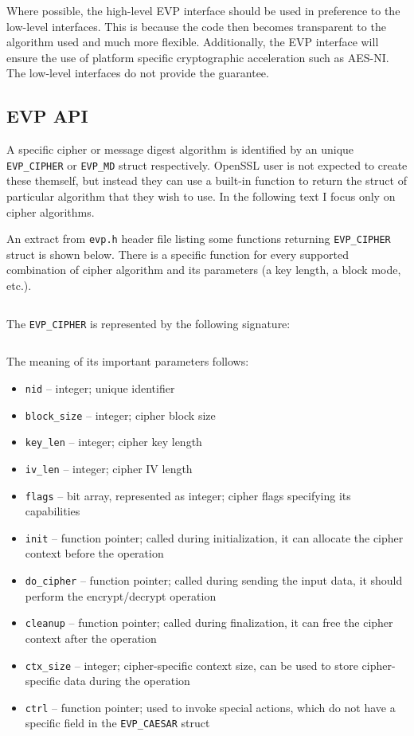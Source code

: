 Where possible, the high-level EVP interface should be used in preference to the low-level interfaces. This is because the code then becomes transparent to the algorithm used and much more flexible. Additionally, the EVP interface will ensure the use of platform specific cryptographic acceleration such as AES-NI. The low-level interfaces do not provide the guarantee.


\subsection{EVP API}
\label{toc/openssl-evp}

A specific cipher or message digest algorithm is identified by an unique \texttt{EVP\_CIPHER} or \texttt{EVP\_MD} struct respectively. OpenSSL user is not expected to create these themself, but instead they can use a built-in function to return the struct of particular algorithm that they wish to use. In the following text I focus only on cipher algorithms.

An extract from \texttt{evp.h} header file listing some functions returning \texttt{EVP\_CIPHER} struct is shown below. There is a specific function for every supported combination of cipher algorithm and its parameters (a key length, a block mode, etc.).

\inputminted{c}{code/openssl-evp-ciphers.c}

The \texttt{EVP\_CIPHER} is represented by the following signature:

\inputminted{c}{code/openssl-evp-cipher.c}

The meaning of its important parameters follows:

\begin{itemize}
  \item \texttt{nid} -- integer; unique identifier
  \item \texttt{block\_size} -- integer; cipher block size
  \item \texttt{key\_len} -- integer; cipher key length
  \item \texttt{iv\_len} -- integer; cipher IV length
  \item \texttt{flags} -- bit array, represented as integer; cipher flags specifying its capabilities
  \item \texttt{init} -- function pointer; called during initialization, it can allocate the cipher context before the operation
  \item \texttt{do\_cipher} -- function pointer; called during sending the input data, it should perform the encrypt/decrypt operation
  \item \texttt{cleanup} -- function pointer; called during finalization, it can free the cipher context after the operation
  \item \texttt{ctx\_size} -- integer; cipher-specific context size, can be used to store cipher-specific data during the operation
  \item \texttt{ctrl} -- function pointer; used to invoke special actions, which do not have a specific field in the \texttt{EVP\_CAESAR} struct
\end{itemize}

